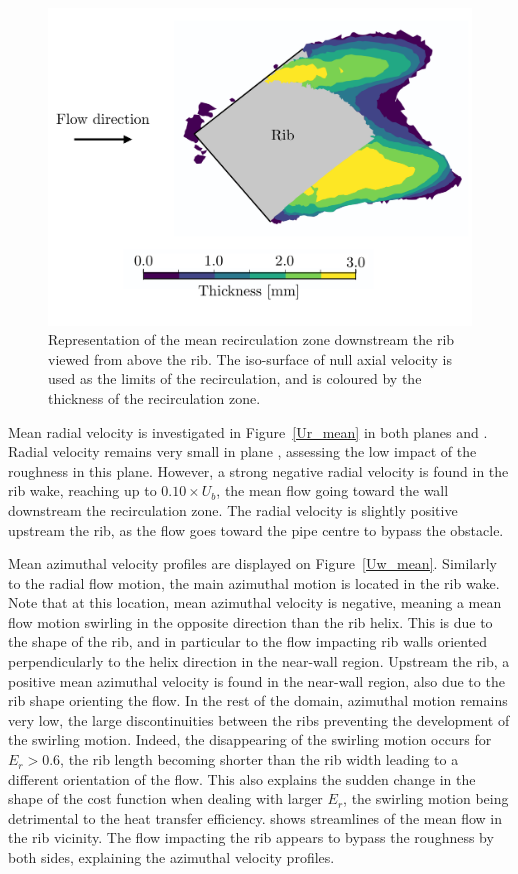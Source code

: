 \begin{figure}[!ht]
\centering
\includegraphics[width=\linewidth]{fig/applications/optim/Recircul.pdf}
\caption{Representation of the mean recirculation zone downstream the rib viewed from above the rib. The iso-surface of null axial velocity is used as the limits of the recirculation, and is coloured by the thickness of the recirculation zone.}
\label{recircul}
\end{figure}

Mean radial velocity is investigated in Figure~\ref{Ur_mean} in both planes  and . Radial velocity remains very small in plane , assessing the low impact of the roughness in this plane. However, a strong negative radial velocity is found in the rib wake, reaching up to $0.10 \times U_b$, the mean flow going toward the wall downstream the recirculation zone. The radial velocity is slightly positive upstream the rib, as the flow goes toward the pipe centre to bypass the obstacle.

Mean azimuthal velocity profiles are displayed on Figure~\ref{Uw_mean}. Similarly to the radial flow motion, the main azimuthal motion is located in the rib wake. Note that at this location, mean azimuthal velocity is negative, meaning a mean flow motion swirling in the opposite direction than the rib helix. This is due to the shape of the rib, and in particular to the flow impacting rib walls oriented perpendicularly to the helix direction in the near-wall region. Upstream the rib, a positive mean azimuthal velocity is found in the near-wall region, also due to the rib shape orienting the flow. In the rest of the domain, azimuthal motion remains very low, the large discontinuities between the ribs preventing the development of the swirling motion. Indeed, the disappearing of the swirling motion occurs for $E_r > 0.6$, the rib length becoming shorter than the rib width leading to a different orientation of the flow. This also explains the sudden change in the shape of the cost function when dealing with larger $E_r$, the swirling motion being detrimental to the heat transfer efficiency.  shows streamlines of the mean flow in the rib vicinity. The flow impacting the rib appears to bypass the roughness by both sides, explaining the azimuthal velocity profiles.

